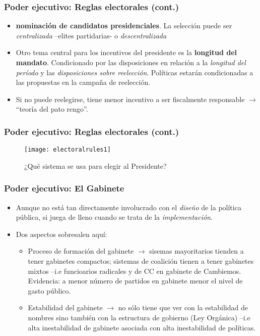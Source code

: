 \documentclass[14pt,aspectratio=169]{beamer}
\begin{document}
      
      \begin{frame}\frametitle{Poder ejecutivo: Reglas electorales (cont.)}
        \begin{itemize}
      \item \textbf{nominación de
            candidatos presidenciales}. La selección puede ser
          \textit{centralizada} --elites partidarias- o
          \textit{descentralizada}
          \item Otro tema central para los
            incentivos del presidente es la \textbf{longitud del
              mandato}. Condicionado por
            las disposiciones en relación a la \textit{longitud del
              período} y las \textit{disposiciones sobre
              reelección}. Políticas estarán condicionadas
            a las propuestas en la campaña de reelección.
            \item Si no puede reelegirse, tiene menor incentivo a ser
              fiscalmente responsable $\longrightarrow $ ``teoría del
              pato rengo''. 
                \end{itemize}
  \end{frame}
        
  
    \begin{frame}\frametitle{Poder ejecutivo: Reglas electorales (cont.)}
 \begin{figure}[htbp]\vspace{0cm}
    \centering
    \texttt{[image: electoralrules1]}
    \caption{¿Qué sistema se usa para elegir al Presidente?}
    \label{fig:1}
  \end{figure}
        \end{frame}


 \begin{frame}\frametitle{Poder ejecutivo: El Gabinete}
  \begin{itemize}
  \item Aunque no está tan directamente involucrado con el \textit{diseño} de
    la política pública, si juega de lleno cuando se trata de la
    \textit{implementación}.
  \item Dos aspectos sobresalen aquí:
    \begin{itemize}
    \item Proceso de formación del gabinete $\longrightarrow$ sisemas
      mayoritarios tienden a tener gabinetes compactos; sistemas de
      coalición tienen a tener gabinetes mixtos --i.e funcioarios
      radicales y de CC en gabinete de Cambiemos. Evidencia: a
      menor número de partidos en gabinete menor el
      nivel de gasto público. 
      \item Estabilidad del gabinete $\longrightarrow$ no sólo tiene
        que ver con la estabilidad de nombres sino también con la
        estructura de gobierno (Ley Orgánica) --i.e alta inestabilidad
        de gabinete asociada con alta inestabilidad de políticas. 
      \end{itemize}
            \end{itemize}
      \end{frame}
\end{document}

